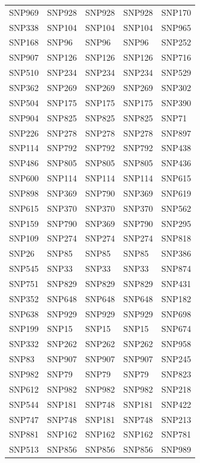 \begin{table}[ht]
\begin{tabular}{lllll}
  SNP969 & SNP928 & SNP928 & SNP928 & SNP170 \\ 
  SNP338 & SNP104 & SNP104 & SNP104 & SNP965 \\ 
  SNP168 & SNP96 & SNP96 & SNP96 & SNP252 \\ 
  SNP907 & SNP126 & SNP126 & SNP126 & SNP716 \\ 
  SNP510 & SNP234 & SNP234 & SNP234 & SNP529 \\ 
  SNP362 & SNP269 & SNP269 & SNP269 & SNP302 \\ 
  SNP504 & SNP175 & SNP175 & SNP175 & SNP390 \\ 
  SNP904 & SNP825 & SNP825 & SNP825 & SNP71 \\ 
  SNP226 & SNP278 & SNP278 & SNP278 & SNP897 \\ 
  SNP114 & SNP792 & SNP792 & SNP792 & SNP438 \\ 
  SNP486 & SNP805 & SNP805 & SNP805 & SNP436 \\ 
  SNP600 & SNP114 & SNP114 & SNP114 & SNP615 \\ 
  SNP898 & SNP369 & SNP790 & SNP369 & SNP619 \\ 
  SNP615 & SNP370 & SNP370 & SNP370 & SNP562 \\ 
  SNP159 & SNP790 & SNP369 & SNP790 & SNP295 \\ 
  SNP109 & SNP274 & SNP274 & SNP274 & SNP818 \\ 
  SNP26 & SNP85 & SNP85 & SNP85 & SNP386 \\ 
  SNP545 & SNP33 & SNP33 & SNP33 & SNP874 \\ 
  SNP751 & SNP829 & SNP829 & SNP829 & SNP431 \\ 
  SNP352 & SNP648 & SNP648 & SNP648 & SNP182 \\ 
  SNP638 & SNP929 & SNP929 & SNP929 & SNP698 \\ 
  SNP199 & SNP15 & SNP15 & SNP15 & SNP674 \\ 
  SNP332 & SNP262 & SNP262 & SNP262 & SNP958 \\ 
  SNP83 & SNP907 & SNP907 & SNP907 & SNP245 \\ 
  SNP982 & SNP79 & SNP79 & SNP79 & SNP823 \\ 
  SNP612 & SNP982 & SNP982 & SNP982 & SNP218 \\ 
  SNP544 & SNP181 & SNP748 & SNP181 & SNP422 \\ 
  SNP747 & SNP748 & SNP181 & SNP748 & SNP213 \\ 
  SNP881 & SNP162 & SNP162 & SNP162 & SNP781 \\ 
  SNP513 & SNP856 & SNP856 & SNP856 & SNP989 \\ 

\end{tabular}
\end{table}
